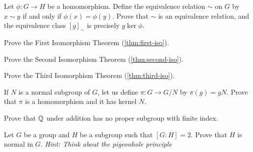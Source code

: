 \documentclass[./main.tex]{subfiles}
\begin{document}
\begin{exercise}
\label{ex:homomorphism-induces-equiv-relation}
    Let $\phi: G \to H$ be a homomorphism. Define the equivalence relation
    $\sim$ on $G$ by $x \sim y$ if and only if $\phi(x) = \phi(y)$. Prove that $\sim$
    is an equivalence relation, and the equivalence class $[g]_\sim$ is
    precisely $g\ker\phi$.
\end{exercise}

\begin{exercise}
\label{ex:prove-first-iso}
    Prove the First Isomorphism Theorem (\cref{thm:first-iso}).
\end{exercise}

\begin{exercise}
\label{ex:prove-second-iso}
    Prove the Second Isomorphism Theorem (\cref{thm:second-iso}).
\end{exercise}

\begin{exercise}
\label{ex:prove-third-iso}
    Prove the Third Isomorphism Theorem (\cref{thm:third-iso}).
\end{exercise}

\begin{exercise}
\label{ex:kernel-of-projection}
    If $N$ is a normal subgroup of $G$, let us define $\pi: G \to G/N$ by
    $\pi(g) = gN$. Prove that $\pi$ is a homomorphism and it has kernel $N$.
\end{exercise}

\begin{exercise}
    Prove that $\mathbb{Q}$ under addition has no proper subgroup with finite index.
\end{exercise}

\begin{exercise}
\label{ex:index-2-subgroups-normal}
    Let $G$ be a group and $H$ be a subgroup such that $[G:H] = 2$. Prove that
    $H$ is normal in $G$. \textit{Hint: Think about the pigeonhole principle}
\end{exercise}
\end{document}
